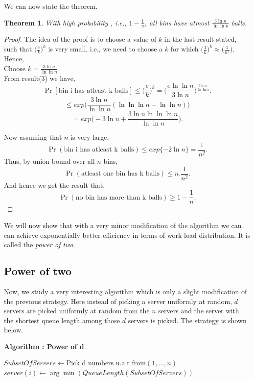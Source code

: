 \documentclass[a4paper,english,12pt]{article}
\newtheorem{theorem}{Theorem}
\begin{document}
We can now state the theorem.
\begin{theorem}
With high probability , i.e., $1-\frac{1}{n}$, all bins have atmost $\frac{3\ln n}{\ln \ln n}$ balls. 
\end{theorem}
\begin{proof}
The idea of the proof is to choose a value of $k$ in the last result stated, such  that $\Big(\frac{e}{k}\Big)^k$ is very small, i.e., we need to choose a $k$ for which $\Big(\frac{1}{k}\Big)^k \approx \Big(\frac{1}{n^2}\Big)$. Hence,\\
Choose $k = \frac{3\ln n}{\ln \ln n}$ .\\
From result(3) we have,
\[\Pr[\text{bin i has atleast k balls}] \leq \Big(\frac{e}{k}\Big)^k =  \Big( \frac{e\ln \ln n}{3 \ln n}\Big)^{\frac{3 \ln n}{\ln \ln n}}.\]
\[\leq exp \Big(\frac{3 \ln n}{\ln \ln n}(\ln \ln \ln n - \ln \ln n)\Big)\]
\[= exp\Big(-3 \ln n + \frac{3 \ln n \ln \ln \ln n}{\ln \ln n}\Big).\]

Now assuming that $n$ is very large,
\[\Pr(\text{bin i has atleast k balls}) \leq exp\{-2\ln n\} = \frac{1}{n^2}.\]
Thus, by union bound over all $n$ bins,
\[\Pr(\text{atleast one bin has k balls}) \leq n.\frac{1}{n^2}.\]
And hence we get the result that,
\[\Pr(\text{no bin has more than k balls}) \geq 1-\frac{1}{n}.\]
\end{proof}
We will now show that with a very minor modification of the algorithm we can can achieve exponentially better efficiency in terms of work load distribution. It is called the \textit{power of two}.
\subsection{Power of two}

Now, we study a very interesting algorithm which is only  a slight modification of the previous strategy. Here instead of picking a server uniformly at random, $d$ servers are picked uniformly at random from the $n$ servers and the server with the shortest queue length among those $d$ servers is picked. The strategy is shown below. 
\begin{algorithm}
\textbf{{Algorithm : Power of d}}\label{euclid2}
\begin{algorithmic}[1]
\State ${SubsetOfServers \gets \text{Pick d numbers u.a.r from} (1,\ldots,n)}$
\State $server(i) \gets \arg\min(QueueLength(SubsetOfServers))$
\EndFor
\State \Return 
\end{algorithmic}
\end{algorithm}
\end{document}
